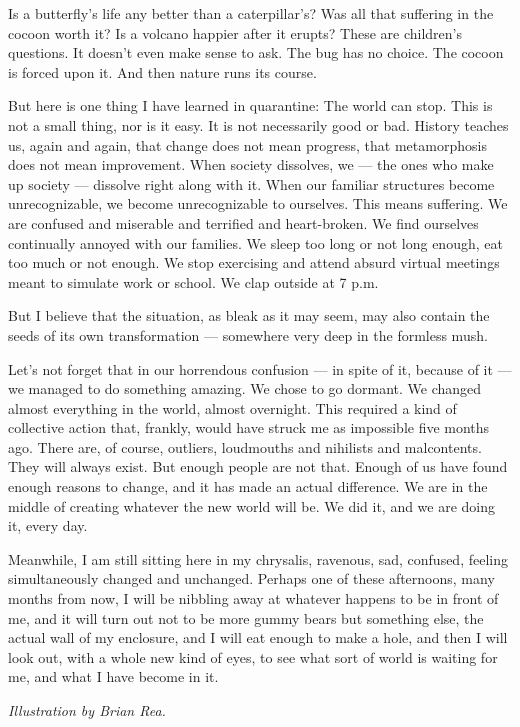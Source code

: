 Is a butterfly's life any better than a caterpillar's? Was all that
suffering in the cocoon worth it? Is a volcano happier after it erupts?
These are children's questions. It doesn't even make sense to ask. The
bug has no choice. The cocoon is forced upon it. And then nature runs
its course.

But here is one thing I have learned in quarantine: The world can stop.
This is not a small thing, nor is it easy. It is not necessarily good or
bad. History teaches us, again and again, that change does not mean
progress, that metamorphosis does not mean improvement. When society
dissolves, we --- the ones who make up society --- dissolve right along
with it. When our familiar structures become unrecognizable, we become
unrecognizable to ourselves. This means suffering. We are confused and
miserable and terrified and heart-broken. We find ourselves continually
annoyed with our families. We sleep too long or not long enough, eat too
much or not enough. We stop exercising and attend absurd virtual
meetings meant to simulate work or school. We clap outside at 7 p.m.

But I believe that the situation, as bleak as it may seem, may also
contain the seeds of its own transformation --- somewhere very deep in
the formless mush.

Let's not forget that in our horrendous confusion --- in spite of it,
because of it --- we managed to do something amazing. We chose to go
dormant. We changed almost everything in the world, almost overnight.
This required a kind of collective action that, frankly, would have
struck me as impossible five months ago. There are, of course, outliers,
loudmouths and nihilists and malcontents. They will always exist. But
enough people are not that. Enough of us have found enough reasons to
change, and it has made an actual difference. We are in the middle of
creating whatever the new world will be. We did it, and we are doing it,
every day.

Meanwhile, I am still sitting here in my chrysalis, ravenous, sad,
confused, feeling simultaneously changed and unchanged. Perhaps one of
these afternoons, many months from now, I will be nibbling away at
whatever happens to be in front of me, and it will turn out not to be
more gummy bears but something else, the actual wall of my enclosure,
and I will eat enough to make a hole, and then I will look out, with a
whole new kind of eyes, to see what sort of world is waiting for me, and
what I have become in it.

\emph{Illustration by Brian Rea.}

